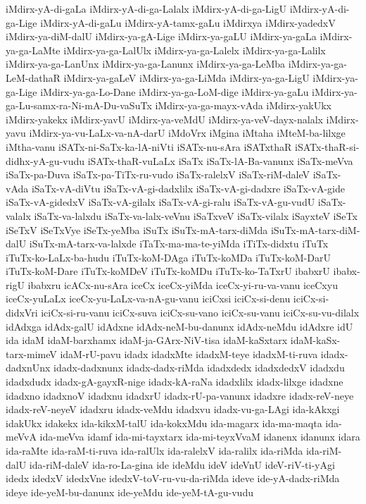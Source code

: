 {iMdirx-yA-di-gaLa
iMdirx-yA-di-ga-Lalalx
iMdirx-yA-di-ga-LigU
iMdirx-yA-di-ga-Lige
iMdirx-yA-di-gaLu
iMdirx-yA-tamx-gaLu
iMdirxya
iMdirx-yadedxV
iMdirx-ya-diM-dalU
iMdirx-ya-gA-Lige
iMdirx-ya-gaLU
iMdirx-ya-gaLa
iMdirx-ya-ga-LaMte
iMdirx-ya-ga-LalUlx
iMdirx-ya-ga-Lalelx
iMdirx-ya-ga-Lalilx
iMdirx-ya-ga-LanUnx
iMdirx-ya-ga-Lanunx
iMdirx-ya-ga-LeMba
iMdirx-ya-ga-LeM-dathaR
iMdirx-ya-gaLeV
iMdirx-ya-ga-LiMda
iMdirx-ya-ga-LigU
iMdirx-ya-ga-Lige
iMdirx-ya-ga-Lo-Dane
iMdirx-ya-ga-LoM-dige
iMdirx-ya-gaLu
iMdirx-ya-ga-Lu-samx-ra-Ni-mA-Du-vaSuTx
iMdirx-ya-ga-mayx-vAda
iMdirx-yakUkx
iMdirx-yakekx
iMdirx-yavU
iMdirx-ya-veMdU
iMdirx-ya-veV-dayx-nalalx
iMdirx-yavu
iMdirx-ya-vu-LaLx-va-nA-darU
iMdoVrx
iMgina
iMtaha
iMteM-ba-lilxge
iMtha-vanu
iSATx-ni-SaTx-ka-lA-niVti
iSATx-nu-sAra
iSATxthaR
iSATx-thaR-si-didhx-yA-gu-vudu
iSATx-thaR-vuLaLx
iSaTx
iSaTx-lA-Ba-vanunx
iSaTx-meVva
iSaTx-pa-Duva
iSaTx-pa-TiTx-ru-vudo
iSaTx-ralelxV
iSaTx-riM-daleV
iSaTx-vAda
iSaTx-vA-diVtu
iSaTx-vA-gi-dadxlilx
iSaTx-vA-gi-dadxre
iSaTx-vA-gide
iSaTx-vA-gidedxV
iSaTx-vA-gilalx
iSaTx-vA-gi-ralu
iSaTx-vA-gu-vudU
iSaTx-valalx
iSaTx-va-lalxdu
iSaTx-va-lalx-veVnu
iSaTxveV
iSaTx-vilalx
iSayxteV
iSeTx
iSeTxV
iSeTxVye
iSeTx-yeMba
iSuTx
iSuTx-mA-tarx-diMda
iSuTx-mA-tarx-diM-dalU
iSuTx-mA-tarx-va-lalxde
iTaTx-ma-ma-te-yiMda
iTiTx-didxtu
iTuTx
iTuTx-ko-LaLx-ba-hudu
iTuTx-koM-DAga
iTuTx-koMDa
iTuTx-koM-DarU
iTuTx-koM-Dare
iTuTx-koMDeV
iTuTx-koMDu
iTuTx-ko-TaTxrU
ibabxrU
ibabx-rigU
ibabxru
icACx-nu-sAra
iceCx
iceCx-yiMda
iceCx-yi-ru-va-vanu
iceCxyu
iceCx-yuLaLx
iceCx-yu-LaLx-va-nA-gu-vanu
iciCxsi
iciCx-si-denu
iciCx-si-didxVri
iciCx-si-ru-vanu
iciCx-suva
iciCx-su-vano
iciCx-su-vanu
iciCx-su-vu-dilalx
idAdxga
idAdx-galU
idAdxne
idAdx-neM-bu-danunx
idAdx-neMdu
idAdxre
idU
ida
idaM
idaM-barxhamx
idaM-ja-GArx-NiV-tisa
idaM-kaSxtarx
idaM-kaSx-tarx-mimeV
idaM-rU-pavu
idadx
idadxMte
idadxM-teye
idadxM-ti-ruva
idadx-dadxnUnx
idadx-dadxnunx
idadx-dadx-riMda
idadxdedx
idadxdedxV
idadxdu
idadxdudx
idadx-gA-gayxR-nige
idadx-kA-raNa
idadxlilx
idadx-lilxge
idadxne
idadxno
idadxnoV
idadxnu
idadxrU
idadx-rU-pa-vanunx
idadxre
idadx-reV-neye
idadx-reV-neyeV
idadxru
idadx-veMdu
idadxvu
idadx-vu-ga-LAgi
ida-kAkxgi
idakUkx
idakekx
ida-kikxM-talU
ida-kokxMdu
ida-magarx
ida-ma-maqta
ida-meVvA
ida-meVva
idamf
ida-mi-tayxtarx
ida-mi-teyxVvaM
idanenx
idanunx
idara
ida-raMte
ida-raM-ti-ruva
ida-ralUlx
ida-ralelxV
ida-ralilx
ida-riMda
ida-riM-dalU
ida-riM-daleV
ida-ro-La-gina
ide
ideMdu
ideV
ideVnU
ideV-riV-ti-yAgi
idedx
idedxV
idedxVne
idedxV-toV-ru-vu-da-riMda
ideve
ide-yA-dadx-riMda
ideye
ide-yeM-bu-danunx
ide-yeMdu
ide-yeM-tA-gu-vudu
}
